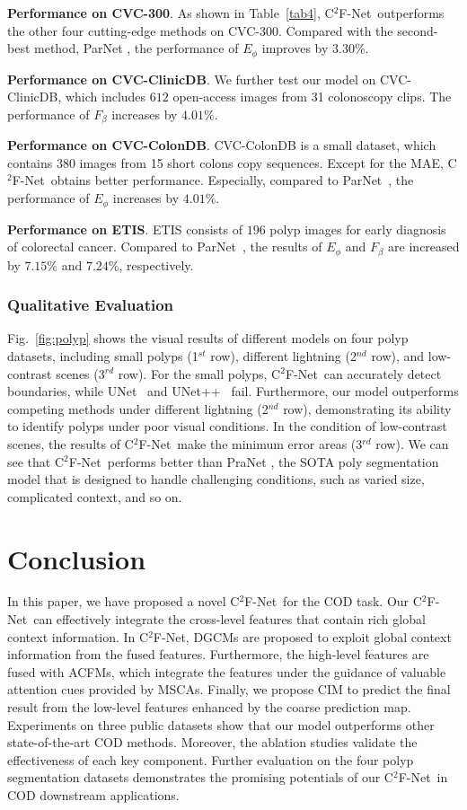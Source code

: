 \documentclass[lettersize,journal]{IEEEtran}
\newcommand{\ourM}{{C$^2$F-Net}}
\begin{document}
\textbf{Performance on CVC-300}. As shown in Table~\ref{tab4}, \ourM~outperforms the other four cutting-edge methods on CVC-300. Compared with the second-best method, ParNet \cite{pranet}, the performance of {$E_\phi$} improves by $3.30\%$.


\textbf{Performance on CVC-ClinicDB}. We further test our model on CVC-ClinicDB, which includes $612$ open-access images from 31 colonoscopy clips. The performance of {$F_\beta$} increases by $4.01\%$. 

\textbf{Performance on CVC-ColonDB}. CVC-ColonDB is a small dataset, which contains $380$ images from 15 short colons copy sequences. Except for the MAE, \ourM~obtains better performance. Especially, compared to ParNet~\cite{pranet}, the performance of {$E_\phi$} increases by $4.01\%$.

\textbf{Performance on ETIS}. ETIS consists of $196$ polyp images for early diagnosis of colorectal cancer. Compared to ParNet~\cite{pranet}, the results of {$E_\phi$} and {$F_\beta$} are increased by $7.15\%$ and $7.24\%$, respectively. 

\subsubsection{Qualitative Evaluation}
Fig.~\ref{fig:polyp} shows the visual results of different models on four polyp datasets, including small polyps (1$^{st}$ row), different lightning (2$^{nd}$ row), and low-contrast scenes (3$^{rd}$ row). For the small polyps, \ourM~can accurately detect boundaries, while UNet~\cite{unet} and UNet++~\cite{unetplus} fail.
Furthermore, our model outperforms competing methods under different lightning (2$^{nd}$ row), demonstrating its ability to identify polyps under poor visual conditions.
In the condition of low-contrast scenes, the results of \ourM~make the minimum error areas (3$^{rd}$ row). We can see that \ourM~performs better than PraNet \cite{pranet}, the SOTA poly segmentation model that is designed to handle challenging conditions, such as varied size, complicated context, and so on.


\section{Conclusion}\label{conclusion}

In this paper, we have proposed a novel \ourM~for the COD task. Our \ourM~can effectively integrate the cross-level features that contain rich global context information. In \ourM, DGCMs are proposed to exploit global context information from the fused features. Furthermore, the high-level features are fused with ACFMs, which integrate the features under the guidance of valuable attention cues provided by MSCAs.
Finally, we propose CIM to predict the final result from the low-level features enhanced by the coarse prediction map.
Experiments on three public datasets show that our model outperforms other state-of-the-art COD methods. Moreover, the ablation studies validate the effectiveness of each key component. Further evaluation on the four polyp segmentation datasets demonstrates the promising potentials of our \ourM~in COD downstream applications.
\end{document}
